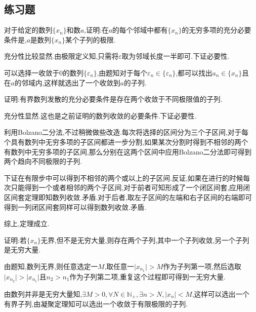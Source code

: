 \documentclass[cn]{elegantbook}
\begin{document}
            \subsection{练习题}
                \begin{exercise}
                    对于给定的数列$\{x_n\}$和数$a$,证明:在$a$的每个邻域中都有$\{x_n\}$的无穷多项的充分必要条件是,$a$是数列$\{x_n\}$某个子列的极限.
                \end{exercise}
                \begin{solution}
                    充分性比较显然.由极限定义知,只需将$\varepsilon$取为邻域长度一半即可.下证必要性.
                    
                    可以选择一收敛于0的数列$\{\varepsilon_n\}$,由题知对于每个$\varepsilon_n\in\{\varepsilon_n\}$,都可以找出$a_n\in\{x_n\}$且在$a$的邻域内,这样就选出了一个收敛到$a$的子列.
                \end{solution}

                \begin{exercise}
                    证明:有界数列发散的充分必要条件是存在两个收敛于不同极限值的子列.
                \end{exercise}
                \begin{solution}
                    充分性显然.这也是之前证明的数列收敛的必要条件.下证必要性.

                    利用Bolzano二分法,不过稍微做些改造.每次将选择的区间分为三个子区间,对于每个具有数列中无穷多项的子区间都进一步分割,如果某次分割时得到不相邻的两个有数列中无穷多项的子区间,那么分别在这两个区间中应用Bolzano二分法即可得到两个趋向不同极限的子列.

                    下证在有限步中可以得到不相邻的两个或以上的子区间.反证,如果在进行的时候每次只能得到一个或者相邻的两个子区间,对于前者可知形成了一个闭区间套,应用闭区间套定理即知数列收敛.矛盾.对于后者,取左子区间的左端和右子区间的右端即可得到一列闭区间套同样可以得到数列收敛.矛盾.

                    综上,定理成立.
                \end{solution}

                \begin{exercise}
                    证明:若$\{x_n\}$无界,但不是无穷大量,则存在两个子列,其中一个子列收敛,另一个子列是无穷大量.
                \end{exercise}
                \begin{solution}
                    由题知,数列无界,则任意选定一$M$,取任意一$\lvert x_{n_1}\rvert>M$作为子列第一项,然后选取$\lvert x_{n_2}\rvert>\lvert x_{n_1}\rvert$且$n_2>n_1$作为子列第二项,重复这个过程即可得到一无穷大量.

                    由数列并非是无穷大量知,$\exists M>0,\forall N\in \mathbb{N}_+,\exists n>N,\lvert x_n\rvert<M$,这样可以选出一个有界子列,由凝聚定理知可以选出一个收敛于有限极限的子列.
                \end{solution}
\end{document}
